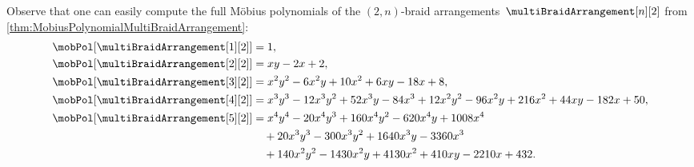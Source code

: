 \documentclass{amsart}
\theoremstyle{definition}
\begin{document}
Observe that one can easily compute the full M\"obius polynomials of the $(2,n)$-braid arrangements~$\multiBraidArrangement[n][2]$ from \cref{thm:MobiusPolynomialMultiBraidArrangement}:
\begin{align*}
\allowdisplaybreaks
\mobPol[{\multiBraidArrangement[1][2]}] & = 1 , \\
\mobPol[{\multiBraidArrangement[2][2]}] & = x y - 2 x + 2 , \\
\mobPol[{\multiBraidArrangement[3][2]}] & = x^2 y^2 - 6 x^2 y + 10 x^2 + 6 x y - 18 x + 8 , \\
\mobPol[{\multiBraidArrangement[4][2]}] & = x^3 y^3 - 12 x^3 y^2 + 52 x^3 y - 84 x^3 + 12 x^2 y^2 - 96 x^2 y + 216 x^2 + 44 x y - 182 x + 50 , \\
\mobPol[{\multiBraidArrangement[5][2]}] & = x^4 y^4 - 20 x^4 y^3 + 160 x^4 y^2 - 620 x^4 y + 1008 x^4 \\ & \quad+ 20 x^3 y^3 - 300 x^3 y^2 + 1640 x^3 y - 3360 x^3 \\ & \quad+ 140 x^2 y^2 - 1430 x^2 y + 4130 x^2 + 410 x y - 2210 x + 432 .
\end{align*}
\end{document}
